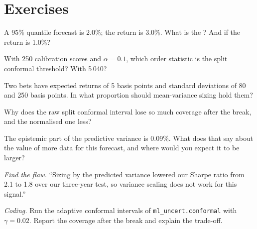 \section{Exercises}

\begin{exercise}[$\star$]\label{exo:ml:probabilistic-models-and-uncertainty:1}
A 95\% quantile forecast is 2.0\%; the return is 3.0\%. What is the ? And if the return is 1.0\%?
\end{exercise}

\begin{exercise}[$\star$]\label{exo:ml:probabilistic-models-and-uncertainty:2}
With 250 calibration scores and $\alpha = 0.1$, which order statistic is the split conformal threshold? With 5\,040?
\end{exercise}

\begin{exercise}[$\star$]\label{exo:ml:probabilistic-models-and-uncertainty:3}
Two bets have expected returns of 5 basis points and standard deviations of 80 and 250 basis points. In what proportion
should mean-variance sizing hold them?
\end{exercise}

\begin{exercise}[$\star\star$]\label{exo:ml:probabilistic-models-and-uncertainty:4}
Why does the raw split conformal interval lose so much coverage after the break, and the normalised one less?
\end{exercise}

\begin{exercise}[$\star\star$]\label{exo:ml:probabilistic-models-and-uncertainty:5}
The epistemic part of the predictive variance is 0.09\%. What does that say about the value of more data for this
forecast, and where would you expect it to be larger?
\end{exercise}

\begin{exercise}[$\star\star$]\label{exo:ml:probabilistic-models-and-uncertainty:6}
\emph{Find the flaw.} ``Sizing by the predicted variance lowered our Sharpe ratio from 2.1 to 1.8 over our three-year
test, so variance scaling does not work for this signal.''
\end{exercise}

\begin{exercise}[$\star\star\star$]\label{exo:ml:probabilistic-models-and-uncertainty:7}
\emph{Coding.} Run the adaptive conformal intervals of \texttt{ml\_uncert.conformal} with $\gamma = 0.02$. Report the
coverage after the break and explain the trade-off.
\end{exercise}

